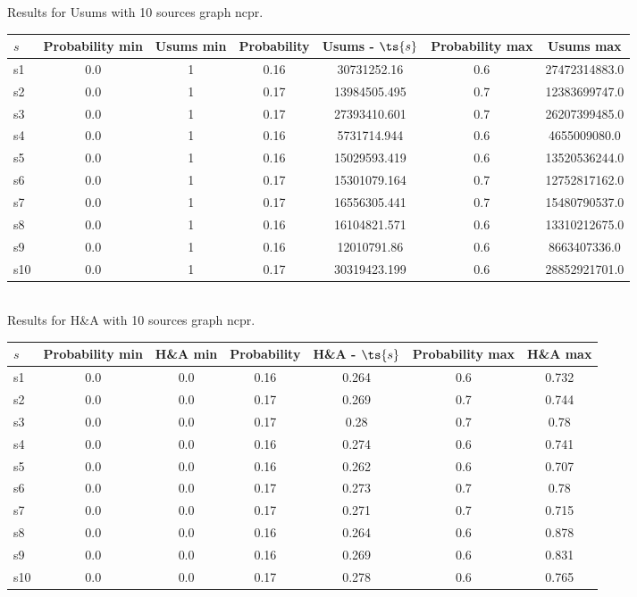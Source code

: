 \documentclass{article}
\begin{document}
\noindent Results for Usums with 10 sources graph ncpr.

\noindent\begin{tabular}{|l|c|c|c|c|c|c|}
\hline
$s$& Probability min & Usums min & Probability & Usums - $\ts{s}$ & Probability max & Usums max\\
\hline
s1 &0.0 & 1 & 0.16 & 30731252.16 & 0.6 & 27472314883.0\\
\hline
s2 &0.0 & 1 & 0.17 & 13984505.495 & 0.7 & 12383699747.0\\
\hline
s3 &0.0 & 1 & 0.17 & 27393410.601 & 0.7 & 26207399485.0\\
\hline
s4 &0.0 & 1 & 0.16 & 5731714.944 & 0.6 & 4655009080.0\\
\hline
s5 &0.0 & 1 & 0.16 & 15029593.419 & 0.6 & 13520536244.0\\
\hline
s6 &0.0 & 1 & 0.17 & 15301079.164 & 0.7 & 12752817162.0\\
\hline
s7 &0.0 & 1 & 0.17 & 16556305.441 & 0.7 & 15480790537.0\\
\hline
s8 &0.0 & 1 & 0.16 & 16104821.571 & 0.6 & 13310212675.0\\
\hline
s9 &0.0 & 1 & 0.16 & 12010791.86 & 0.6 & 8663407336.0\\
\hline
s10 &0.0 & 1 & 0.17 & 30319423.199 & 0.6 & 28852921701.0\\
\hline
\end{tabular}\\

\noindent Results for H\&A with 10 sources graph ncpr.

\noindent\begin{tabular}{|l|c|c|c|c|c|c|}
\hline
$s$& Probability min & H\&A min & Probability & H\&A - $\ts{s}$ & Probability max & H\&A max\\
\hline
s1 &0.0 & 0.0 & 0.16 & 0.264 & 0.6 & 0.732\\
\hline
s2 &0.0 & 0.0 & 0.17 & 0.269 & 0.7 & 0.744\\
\hline
s3 &0.0 & 0.0 & 0.17 & 0.28 & 0.7 & 0.78\\
\hline
s4 &0.0 & 0.0 & 0.16 & 0.274 & 0.6 & 0.741\\
\hline
s5 &0.0 & 0.0 & 0.16 & 0.262 & 0.6 & 0.707\\
\hline
s6 &0.0 & 0.0 & 0.17 & 0.273 & 0.7 & 0.78\\
\hline
s7 &0.0 & 0.0 & 0.17 & 0.271 & 0.7 & 0.715\\
\hline
s8 &0.0 & 0.0 & 0.16 & 0.264 & 0.6 & 0.878\\
\hline
s9 &0.0 & 0.0 & 0.16 & 0.269 & 0.6 & 0.831\\
\hline
s10 &0.0 & 0.0 & 0.17 & 0.278 & 0.6 & 0.765\\
\hline
\end{tabular}\\
\end{document}
